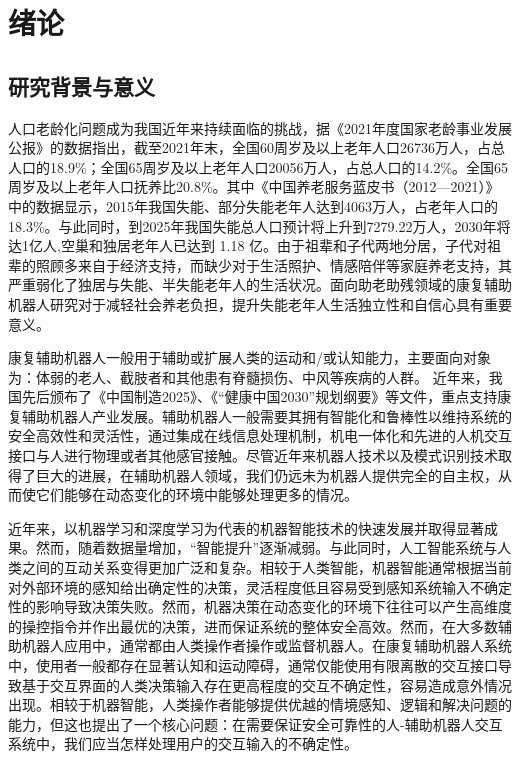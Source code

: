 
\chapter{绪论}

\section{研究背景与意义}
人口老龄化问题成为我国近年来持续面临的挑战，据《2021年度国家老龄事业发展公报》\cite{2021NianDuGuoJiaLaoLingShiYeFaZhanGongBao}的数据指出，截至2021年末，全国60周岁及以上老年人口26736万人，占总人口的18.9\%；全国65周岁及以上老年人口20056万人，占总人口的14.2\%。全国65周岁及以上老年人口抚养比20.8\%。其中《中国养老服务蓝皮书（2012—2021）》\cite{YangZhongGuoYangLaoFuWuLanPiShu201220212022}中的数据显示，2015年我国失能、部分失能老年人达到4063万人，占老年人口的18.3\%。与此同时，到2025年我国失能总人口预计将上升到7279.22万人，2030年将达1亿人,空巢和独居老年人已达到 1.18 亿。由于祖辈和子代两地分居，子代对祖辈的照顾多来自于经济支持，而缺少对于生活照护、情感陪伴等家庭养老支持，其严重弱化了独居与失能、半失能老年人的生活状况。面向助老助残领域的康复辅助机器人研究对于减轻社会养老负担，提升失能老年人生活独立性和自信心具有重要意义。

康复辅助机器人一般用于辅助或扩展人类的运动和/或认知能力，主要面向对象为：体弱的老人、截肢者和其他患有脊髓损伤、中风等疾病的人群。 近年来，我国先后颁布了《中国制造2025》\cite{ZhongGuoZhiZao2025}、《“健康中国2030”规划纲要》\cite{LiuYangJianKangZhongGuo2030GuiHuaGangYao}等文件，重点支持康复辅助机器人产业发展。辅助机器人一般需要其拥有智能化和鲁棒性以维持系统的安全高效性和灵活性，通过集成在线信息处理机制，机电一体化和先进的人机交互接口与人进行物理或者其他感官接触。尽管近年来机器人技术以及模式识别技术取得了巨大的进展，在辅助机器人领域，我们仍远未为机器人提供完全的自主权，从而使它们能够在动态变化的环境中能够处理更多的情况。

近年来，以机器学习和深度学习为代表的机器智能技术的快速发展并取得显著成果。然而，随着数据量增加，``智能提升''逐渐减弱。与此同时，人工智能系统与人类之间的互动关系变得更加广泛和复杂\cite{ZhaoQianTanKongZhiZhongDeGongXiangXinXiHeGongXiangZiZhu2021}。相较于人类智能，机器智能通常根据当前对外部环境的感知给出确定性的决策，灵活程度低且容易受到感知系统输入不确定性的影响导致决策失败。然而，机器决策在动态变化的环境下往往可以产生高维度的操控指令并作出最优的决策，进而保证系统的整体安全高效。然而，在大多数辅助机器人应用中，通常都由人类操作者操作或监督机器人。在康复辅助机器人系统中，使用者一般都存在显著认知和运动障碍，通常仅能使用有限离散的交互接口导致基于交互界面的人类决策输入存在更高程度的交互不确定性，容易造成意外情况出现。相较于机器智能，人类操作者能够提供优越的情境感知、逻辑和解决问题的能力，但这也提出了一个核心问题：在需要保证安全可靠性的人-辅助机器人交互系统中，我们应当怎样处理用户的交互输入的不确定性。

